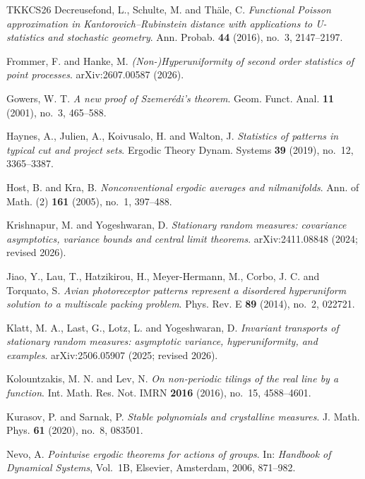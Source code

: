 \documentclass[11pt,reqno,a4paper]{amsart}
\numberwithin{equation}{section}
\theoremstyle{compact}
\theoremstyle{definition}
\theoremstyle{definition}
\begin{document}
\begin{thebibliography}{TKKCS26}
Decreusefond, L., Schulte, M. and Th\"ale, C.
\newblock \emph{Functional Poisson approximation in Kantorovich--Rubinstein distance with applications to U-statistics and stochastic geometry}.
\newblock Ann. Probab. \textbf{44} (2016), no.~3, 2147--2197.

Frommer, F. and Hanke, M.
\newblock \emph{(Non-)Hyperuniformity of second order statistics of point processes}.
\newblock arXiv:2607.00587 (2026).

Gowers, W. T.
\newblock \emph{A new proof of Szemer\'edi's theorem}.
\newblock Geom. Funct. Anal. \textbf{11} (2001), no.~3, 465--588.

Haynes, A., Julien, A., Koivusalo, H. and Walton, J.
\newblock \emph{Statistics of patterns in typical cut and project sets}.
\newblock Ergodic Theory Dynam. Systems \textbf{39} (2019), no.~12, 3365--3387.

Host, B. and Kra, B.
\newblock \emph{Nonconventional ergodic averages and nilmanifolds}.
\newblock Ann. of Math. (2) \textbf{161} (2005), no.~1, 397--488.

Krishnapur, M. and Yogeshwaran, D.
\newblock \emph{Stationary random measures: covariance asymptotics, variance bounds and central limit theorems}.
\newblock arXiv:2411.08848 (2024; revised 2026).

Jiao, Y., Lau, T., Hatzikirou, H., Meyer-Hermann, M., Corbo, J. C. and Torquato, S.
\newblock \emph{Avian photoreceptor patterns represent a disordered hyperuniform solution to a multiscale packing problem}.
\newblock Phys. Rev. E \textbf{89} (2014), no.~2, 022721.

Klatt, M. A., Last, G., Lotz, L. and Yogeshwaran, D.
\newblock \emph{Invariant transports of stationary random measures: asymptotic variance, hyperuniformity, and examples}.
\newblock arXiv:2506.05907 (2025; revised 2026).

Kolountzakis, M. N. and Lev, N.
\newblock \emph{On non-periodic tilings of the real line by a function}.
\newblock Int. Math. Res. Not. IMRN \textbf{2016} (2016), no.~15, 4588--4601.

Kurasov, P. and Sarnak, P.
\newblock \emph{Stable polynomials and crystalline measures}.
\newblock J. Math. Phys. \textbf{61} (2020), no.~8, 083501.

Nevo, A.
\newblock \emph{Pointwise ergodic theorems for actions of groups}.
\newblock In: \emph{Handbook of Dynamical Systems}, Vol.~1B, Elsevier,
Amsterdam, 2006, 871--982.


\end{thebibliography}
\end{document}
